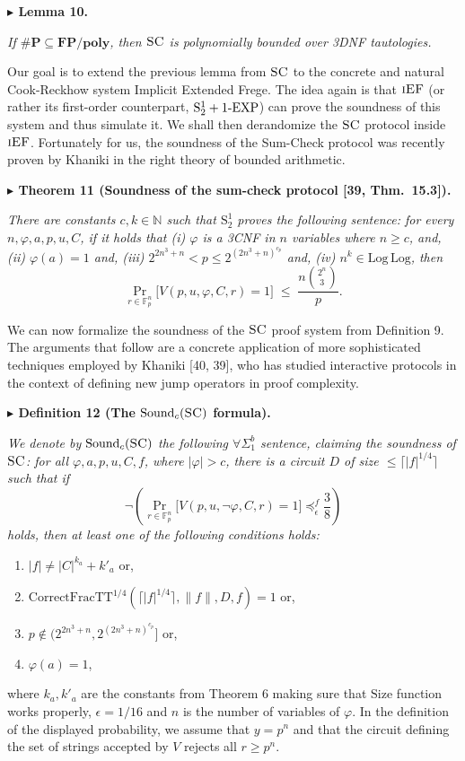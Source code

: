 \documentclass[11pt]{article}
\newcommand{\Stwo}{\mathrm{S}^{1}_{2}}
\newcommand{\oneEXP}{\textnormal{1-EXP}}
\newcommand{\SC}{\textsc{SC}}
\newcommand{\iEF}{\textsc{iEF}}
\newcommand{\Fpn}{\mathbb{F}_{p}^{n}}
\newcommand{\N}{\mathbb{N}}
\newcommand{\Size}{\mathrm{Size}}
\newcommand{\CFTT}{\mathrm{CorrectFracTT}}
\newcommand{\Snd}{\mathrm{Sound}}
\newcommand{\ceiling}[1]{\lceil #1 \rceil}
\newenvironment{statement}[1]%
  {\par\medskip\noindent\textbf{#1}\par\nopagebreak\smallskip\noindent\itshape}%
  {\par\medskip}
\begin{document}
\begin{statement}{$\blacktriangleright$ Lemma 10.}
If $\#\mathbf{P} \subseteq \mathbf{FP}/\mathbf{poly}$, then $\SC$ is polynomially bounded over
3DNF tautologies.
\end{statement}

Our goal is to extend the previous lemma from $\SC$ to the concrete and natural Cook-Reckhow
system Implicit Extended Frege. The idea again is that $\iEF$ (or rather its first-order
counterpart, $\Stwo+\oneEXP$) can prove the soundness of this system and thus simulate it. We
shall then derandomize the $\SC$ protocol inside $\iEF$. Fortunately for us, the soundness of
the Sum-Check protocol was recently proven by Khaniki in the right theory of bounded
arithmetic.

\begin{statement}{$\blacktriangleright$ Theorem 11 (Soundness of the sum-check protocol [39, Thm.\ 15.3]).}
There are constants $c,k \in \N$ such that $\Stwo$ proves the following sentence: for every
$n,\varphi,a,p,u,C$, if it holds that (i) $\varphi$ is a 3CNF in $n$ variables where $n \ge c$,
and, (ii) $\varphi(a) = 1$ and, (iii) $2^{2n^{3}+n} < p \le 2^{(2n^{3}+n)^{c_{p}}}$ and,
(iv) $n^{k} \in \mathrm{Log}\,\mathrm{Log}$, then
\[
  \Pr_{r\in\Fpn}\bigl[V(p,u,\varphi,C,r) = 1\bigr] \;\le\; \frac{n\binom{2^{n}}{3}}{p}.
\]
\end{statement}

We can now formalize the soundness of the $\SC$ proof system from Definition 9. The arguments
that follow are a concrete application of more sophisticated techniques employed by Khaniki
[40, 39], who has studied interactive protocols in the context of defining new jump operators
in proof complexity.

\begin{statement}{$\blacktriangleright$ Definition 12 (The $\Snd_{c}(\SC)$ formula).}
We denote by $\Snd_{c}(\SC)$ the following $\forall\Sigma^{b}_{1}$ sentence, claiming the
soundness of $\SC$: for all $\varphi,a,p,u,C,f$, where $|\varphi| > c$, there is a circuit $D$
of size $\le \ceiling{|f|^{1/4}}$ such that if
\[
  \neg\left(\Pr_{r\in\Fpn}\bigl[V(p,u,\neg\varphi,C,r) = 1\bigr] \preceq^{f}_{\epsilon} \frac{3}{8}\right)
\]
holds, then at least one of the following conditions holds:
\begin{enumerate}
\item[(i)] $|f| \ne |C|^{k_{a}} + k'_{a}$ or,
\item[(ii)] $\CFTT^{1/4}(\ceiling{|f|^{1/4}}, \|f\|, D, f) = 1$ or,
\item[(iii)] $p \notin (2^{2n^{3}+n}, 2^{(2n^{3}+n)^{c_{p}}}]$ or,
\item[(iv)] $\varphi(a) = 1$,
\end{enumerate}
where $k_{a},k'_{a}$ are the constants from Theorem 6 making sure that $\Size$ function works
properly, $\epsilon = 1/16$ and $n$ is the number of variables of $\varphi$. In the definition
of the displayed probability, we assume that $y = p^{n}$ and that the circuit defining the set
of strings accepted by $V$ rejects all $r \ge p^{n}$.
\end{statement}
\end{document}
